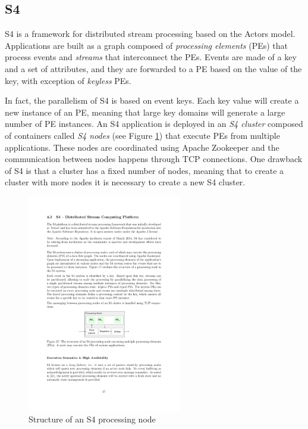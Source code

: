 \documentclass[ppgc,diss,english]{iiufrgs}
\begin{document}
\subsection{S4}

S4 is a framework for distributed stream processing based on the Actors model. Applications are built as a graph composed of \emph{processing elements} (PEs) that process events and \emph{streams} that interconnect the PEs. Events are made of a key and a set of attributes, and they are forwarded to a PE based on the value of the key, with exception of \emph{keyless} PEs.

In fact, the parallelism of S4 is based on event keys. Each key value will create a new instance of an PE, meaning that large key domains will generate a large number of PE instances. An S4 application is deployed in an \emph{S4 cluster} composed of containers called \emph{S4 nodes} (see Figure \ref{fig:s4_structure}) that execute PEs from multiple applications. These nodes are coordinated using Apache Zookeeper and the communication between nodes happens through TCP connections. One drawback of S4 is that a cluster has a fixed number of nodes, meaning that to create a cluster with more nodes it is necessary to create a new S4 cluster.

\begin{figure}[!ht]
	\centering
	\includegraphics[width=0.6\textwidth]{images/s4/structure.pdf}
	\caption[Structure of an S4 processing node]{Structure of an S4 processing node \cite{bockermann2014survey}}
	\label{fig:s4_structure}
\end{figure}
\end{document}
